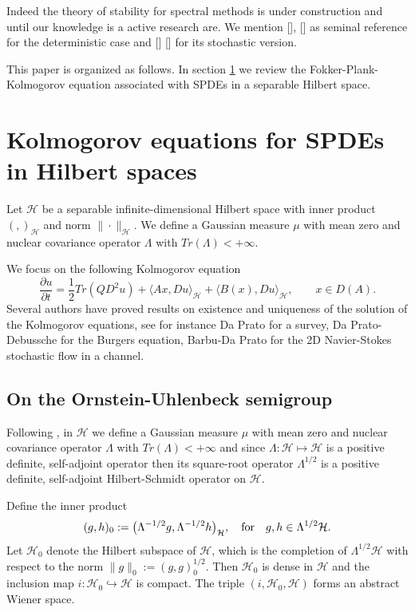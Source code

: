 \documentclass[review, onefignum, onetabnum]{siamart171218}
\begin{document}
    Indeed the theory of stability for spectral methods is under construction 
and until our knowledge is a active research are. We mention [], [] as seminal 
reference for the deterministic case and [] [] for its stochastic version.

    This paper is organized as follows. In section \ref{fpk-sect} we review the
Fokker-Plank-Kolmogorov equation associated with SPDEs in
a separable Hilbert space.

\section{Kolmogorov equations for SPDEs in Hilbert spaces}\label{fpk-sect}
    Let $\mathcal{H}$ be a separable infinite-dimensional Hilbert space with
inner product $( ,  )_\mathcal{H} $ and norm $\|\cdot\|_\mathcal{H}$. We define
a Gaussian measure $\mu$ with mean zero and nuclear covariance operator
$\Lambda$ with  $Tr(\Lambda)<+\infty$.

    We focus on the following Kolmogorov equation
\begin{equation}
    \label{P1s2.3}
    \frac{\partial u}{\partial t}= \frac{1}{2}Tr(QD^2u)+ \langle Ax, Du
    \rangle_\mathcal{H} + \langle B(x),Du \rangle_\mathcal{H},\qquad x\in D(A).
\end{equation}
    Several authors have proved results on existence and uniqueness of the
solution of the Kolmogorov equations, see for instance Da Prato \cite{da} for a
survey, Da Prato-Debussche \cite{da-de} for the Burgers equation,  Barbu-Da
Prato \cite{ba-da} for the 2D Navier-Stokes stochastic flow in a channel.
%
\subsection{On the Ornstein-Uhlenbeck semigroup}\label{OUS-sect}
    Following \cite{liu},  in $\mathcal{H}$ we define a Gaussian measure $\mu$
with mean zero and nuclear covariance operator $\Lambda$ with
${Tr(\Lambda)<+\infty}$ and since $\Lambda:\mathcal{H}\mapsto \mathcal{H}$ is a
positive definite, self-adjoint operator then its square-root operator
$\Lambda^{1/2}$ is a positive definite, self-adjoint Hilbert-Schmidt operator
on $\mathcal{H}$.

    Define the inner product
\[
    ( g, h )_0 := \big( \Lambda^{-1/2}g ,  \Lambda^{-1/2} h \big)_\mathcal{H},
    \quad \hbox{\rm for}\quad g,h\in \Lambda^{1/2} \mathcal{H}.
\]
Let $\mathcal{H}_0$ denote the Hilbert subspace of $\mathcal{H}$, which is the
completion of $\Lambda^{1/2} \mathcal{H}$ with
respect to the norm $\|g\|_0:= ( g, g )_0^{1/2} $. Then ${\mathcal{H}_0}$ is
dense in $\mathcal{H}$ and the inclusion map
$i:\mathcal{H}_0\hookrightarrow\mathcal{H}$ is compact. The triple
$(i,\mathcal{H}_0,\mathcal{H})$ forms an abstract Wiener space.
\end{document}
